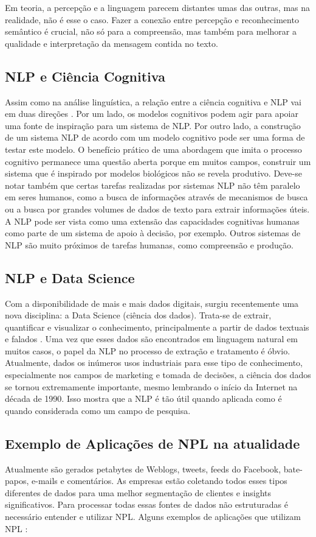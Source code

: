 \documentclass[
	12pt,				%
	openright,			%
	oneside,			%
	a4paper,			%
	english,			%
	spanish,			%
	brazil				%
	]{abntex2}
\begin{document}
Em teoria, a percepção e a linguagem parecem distantes umas das outras, mas na realidade, não é esse o caso. Fazer a conexão entre percepção e reconhecimento semântico é crucial, não só para a compreensão, mas também para melhorar a qualidade e interpretação da mensagem contida no texto. 

	\subsection*{NLP e Ciência Cognitiva}
	Assim como na análise linguística, a relação entre a ciência cognitiva e NLP vai em duas direções \cite{book_natural_lang}. Por um lado, os modelos cognitivos podem agir para apoiar uma fonte de inspiração para um sistema de NLP. Por outro lado, a construção de um sistema NLP de acordo com um modelo cognitivo pode ser uma forma de testar este modelo. O benefício prático de uma abordagem que imita o processo cognitivo permanece uma questão aberta porque em muitos campos, construir um sistema que é inspirado por modelos biológicos não se revela produtivo. Deve-se notar também que certas tarefas realizadas por sistemas NLP não têm paralelo em seres humanos, como a busca de informações através de mecanismos de busca ou a busca por grandes volumes de dados de texto para extrair informações úteis. A NLP pode ser vista como uma extensão das capacidades cognitivas humanas como parte de um sistema de apoio à decisão, por exemplo. Outros sistemas de NLP são muito próximos de tarefas humanas, como compreensão e produção.
	
	\subsection*{NLP e Data Science}	
	Com a disponibilidade de mais e mais dados digitais, surgiu recentemente uma nova disciplina: a Data Science (ciência dos dados). Trata-se de extrair, quantificar e visualizar o conhecimento, principalmente a partir de dados textuais e falados \cite{book_natural_lang}. Uma vez que esses dados são encontrados em linguagem natural em muitos casos, o papel da NLP no processo de extração e tratamento é óbvio. Atualmente, dados os inúmeros usos industriais para esse tipo de conhecimento, especialmente nos campos de marketing e tomada de decisões, a ciência dos dados se tornou extremamente importante, mesmo lembrando o início da Internet na década de 1990. Isso mostra que a NLP é tão útil quando aplicada como é quando considerada como um campo de pesquisa.

	\subsection*{Exemplo de Aplicações de NPL na atualidade}
	Atualmente são gerados petabytes de Weblogs, tweets, feeds do Facebook, bate-papos, e-mails e comentários. As empresas estão coletando todos esses tipos diferentes de dados para uma melhor segmentação de clientes e insights significativos. Para processar todas essas fontes de dados não estruturadas é necessário entender e utilizar NPL.
Alguns exemplos de aplicações que utilizam NPL \cite{book_natlang_python}:
\end{document}
